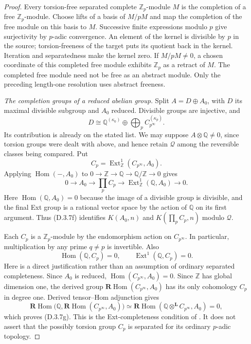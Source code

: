 \begin{proof}
Every torsion-free separated complete $\mathbb Z_p$-module $M$ is
the completion of a free $\mathbb Z_p$-module.  Choose lifts of a
basis of $M/pM$ and map the completion of the free module on this
basis to $M$.  Successive finite expressions modulo $p$ give
surjectivity by $p$-adic convergence.  An element of the kernel is
divisible by $p$ in the source; torsion-freeness of the target puts
its quotient back in the kernel.  Iteration and separatedness make
the kernel zero.  If $M/pM\ne0$, a chosen coordinate of this
completed free module exhibits $\mathbb Z_p$ as a retract of $M$.
The completed free module need not be free as an abstract module.
Only the preceding length-one resolution uses abstract freeness.

\medskip\noindent
\emph{The completion groups of a reduced abelian group.}
Split $A=D\oplus A_0$, with $D$ its maximal divisible subgroup and
$A_0$ reduced.  Divisible groups are injective, and
\[
 D\cong\mathbb Q^{(\kappa_0)}
              \oplus\bigoplus_p C_{p^\infty}^{(\kappa_p)}.
\]
Its contribution is already on the stated list.  We may suppose
$A\otimes\mathbb Q\ne0$, since torsion groups were dealt with
above, and hence retain $\mathcal Q$ among the reversible classes
being compared.  Put
\[
                   C_p=\operatorname{Ext}^1_{\mathbb Z}
                                  (C_{p^\infty},A_0).
\]
Applying $\operatorname{Hom}(-,A_0)$ to
$0\to\mathbb Z\to\mathbb Q\to\mathbb Q/\mathbb Z\to0$
gives
\[
 0\longrightarrow A_0\longrightarrow\prod_p C_p
       \longrightarrow\operatorname{Ext}^1_{\mathbb Z}
                                 (\mathbb Q,A_0)\longrightarrow0.
 \tag{D.3.7f}
\]
Here $\operatorname{Hom}(\mathbb Q,A_0)=0$ because the image of
a divisible group is divisible, and the final Ext group is a
rational vector space by the action of $\mathbb Q$ on its first
argument.  Thus (D.3.7f) identifies $K(A_0,n)$ and
$K(\prod_p C_p,n)$ modulo $\mathcal Q$.

Each $C_p$ is a $\mathbb Z_p$-module by the endomorphism action on
$C_{p^\infty}$.  In particular, multiplication by any prime
$q\ne p$ is invertible.  Also
\[
       \operatorname{Hom}(\mathbb Q,C_p)=0,
       \qquad \operatorname{Ext}^1(\mathbb Q,C_p)=0.
 \tag{D.3.7g}
\]
Here is a direct justification rather than an assumption of ordinary
separated completeness.  Since $A_0$ is reduced,
$\operatorname{Hom}(C_{p^\infty},A_0)=0$.  Since $\mathbb Z$ has
global dimension one, the derived group
$\mathbf R\operatorname{Hom}(C_{p^\infty},A_0)$ has its only
cohomology $C_p$ in degree one.  Derived tensor--Hom adjunction gives
\[
 \mathbf R\operatorname{Hom}\bigl(\mathbb Q,
       \mathbf R\operatorname{Hom}(C_{p^\infty},A_0)\bigr)
  \simeq
 \mathbf R\operatorname{Hom}
       (\mathbb Q\otimes^{\mathbf L}C_{p^\infty},A_0)=0,
\]
which proves (D.3.7g).  This is the Ext-completeness condition of
\citet[Section~5.6]{EH5Bousfield1997}.  It does not assert that the
possibly torsion group $C_p$ is separated for its ordinary $p$-adic
topology.


\end{proof}
